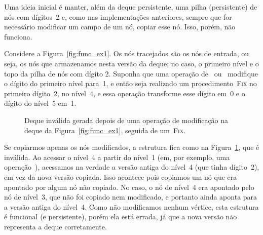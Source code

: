 \documentclass[main.tex]{subfiles}
\begin{document}
Uma ideia inicial é manter, além da deque persistente, uma pilha (persistente) de nós com dígitos~2 e, como nas implementações anteriores, sempre que for necessário modificar um campo de um nó, copiar esse nó. Isso, porém, não funciona.

Considere a Figura~\ref{fig:func_ex1}. Os nós tracejados são os nós de entrada, ou seja, os nós que armazenamos nesta versão da deque; no caso, o primeiro nível e o topo da pilha de nós com dígito 2. Suponha que uma operação de~ ou~ modifique o dígito do primeiro nível para~1, e então seja realizado um procedimento~\textsc{Fix} no primeiro dígito~2, no nível~4, e essa operação transforme esse dígito em~0 e o dígito do nível~5 em~1.

\begin{figure}
\centering
{}
\caption{Deque inválida gerada depois de uma operação de modificação na deque da Figura~\ref{fig:func_ex1}, seguida de um~\textsc{Fix}.} \label{fig:func_ex1res}
\end{figure}

Se copiarmos apenas os nós modificados, a estrutura fica como na Figura~\ref{fig:func_ex1res}, que é inválida. Ao acessar o nível~4 a partir do nível~1 (em, por exemplo, uma operação~), acessamos na verdade a versão antiga do nível~4 (que tinha dígito~2), em vez da nova versão copiada. Isso acontece pois copiamos um nó que era apontado por algum nó não copiado. No caso, o nó de nível~4 era apontado pelo nó de nível~3, que não foi copiado nem modificado, e portanto ainda aponta para a versão antiga do nível~4. Como não modificamos nenhum vértice, esta estrutura é funcional (e persistente), porém ela está errada, já que a nova versão não representa a deque corretamente.
\end{document}
